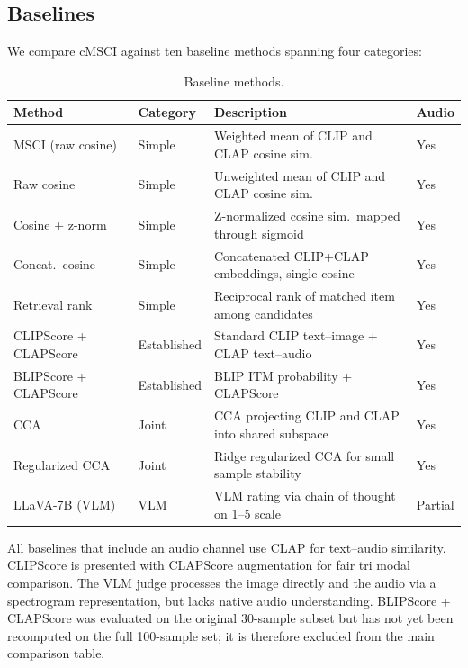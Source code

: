 \subsection{Baselines}\label{sec:baselines}

We compare cMSCI against ten baseline methods spanning four categories:

\begin{table}[t]
\caption{Baseline methods.}\label{tab:baselines}
\centering
\small
\begin{tabular}{llp{4.2cm}l}
\toprule
Method & Category & Description & Audio \\
\midrule
MSCI (raw cosine) & Simple & Weighted mean of CLIP and CLAP cosine sim. & Yes \\
Raw cosine & Simple & Unweighted mean of CLIP and CLAP cosine sim. & Yes \\
Cosine + z-norm & Simple & Z-normalized cosine sim.\ mapped through sigmoid & Yes \\
Concat.\ cosine & Simple & Concatenated CLIP+CLAP embeddings, single cosine & Yes \\
Retrieval rank & Simple & Reciprocal rank of matched item among candidates & Yes \\
CLIPScore + CLAPScore & Established & Standard CLIP text--image + CLAP text--audio & Yes \\
BLIPScore + CLAPScore & Established & BLIP ITM probability + CLAPScore & Yes \\
CCA & Joint & CCA projecting CLIP and CLAP into shared subspace & Yes \\
Regularized CCA & Joint & Ridge regularized CCA for small sample stability & Yes \\
LLaVA-7B (VLM) & VLM & VLM rating via chain of thought on 1--5 scale & Partial \\
\bottomrule
\end{tabular}
\end{table}

All baselines that include an audio channel use CLAP for text--audio similarity. CLIPScore is presented with CLAPScore augmentation for fair tri modal comparison. The VLM judge processes the image directly and the audio via a spectrogram representation, but lacks native audio understanding. BLIPScore + CLAPScore was evaluated on the original 30-sample subset but has not yet been recomputed on the full 100-sample set; it is therefore excluded from the main comparison table.

